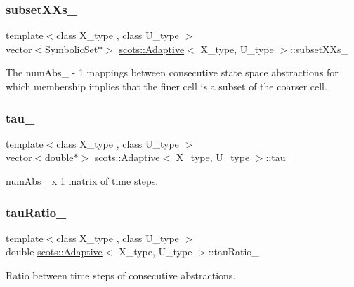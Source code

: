 \subsubsection{\texorpdfstring{subset\+X\+Xs\+\_\+}{subsetXXs\_}}
{\footnotesize\ttfamily template$<$class X\+\_\+type , class U\+\_\+type $>$ \\
vector$<$Symbolic\+Set$\ast$$>$ \hyperlink{classscots_1_1Adaptive}{scots\+::\+Adaptive}$<$ X\+\_\+type, U\+\_\+type $>$\+::subset\+X\+Xs\+\_\+}

The num\+Abs\+\_\+ -\/ 1 mappings between consecutive state space abstractions for which membership implies that the finer cell is a subset of the coarser cell. \mbox{\label{classscots_1_1Adaptive_a2276dbf06b4db12739aed70443c1a32d}} 
\subsubsection{\texorpdfstring{tau\+\_\+}{tau\_}}
{\footnotesize\ttfamily template$<$class X\+\_\+type , class U\+\_\+type $>$ \\
vector$<$double$\ast$$>$ \hyperlink{classscots_1_1Adaptive}{scots\+::\+Adaptive}$<$ X\+\_\+type, U\+\_\+type $>$\+::tau\+\_\+}

num\+Abs\+\_\+ x 1 matrix of time steps. \mbox{\label{classscots_1_1Adaptive_a33592a853774854552908de4762f8f8c}} 
\subsubsection{\texorpdfstring{tau\+Ratio\+\_\+}{tauRatio\_}}
{\footnotesize\ttfamily template$<$class X\+\_\+type , class U\+\_\+type $>$ \\
double \hyperlink{classscots_1_1Adaptive}{scots\+::\+Adaptive}$<$ X\+\_\+type, U\+\_\+type $>$\+::tau\+Ratio\+\_\+}

Ratio between time steps of consecutive abstractions. \mbox{\label{classscots_1_1Adaptive_ab9f37fda9e698b797079d28b243f3a5b}} 
